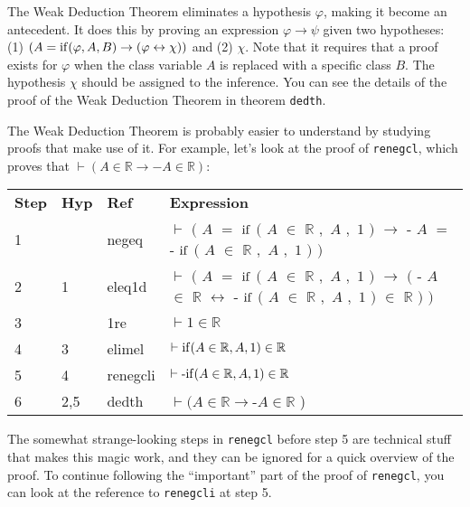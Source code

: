 The Weak Deduction Theorem
eliminates a hypothesis $\varphi$, making it become an antecedent.
It does this by proving an expression
$ \varphi \rightarrow \psi $ given two hypotheses:
(1)
$ ( A = {\rm if} ( \varphi , A , B ) \rightarrow ( \varphi \leftrightarrow \chi ) ) $
and
(2) $\chi$.
Note that it requires that a proof exists for $\varphi$ when the class variable
$A$ is replaced with a specific class $B$. The hypothesis $\chi$
should be assigned to the inference.
You can see the details of the proof of the Weak Deduction Theorem
in theorem \texttt{dedth}.

The Weak Deduction Theorem
is probably easier to understand by studying proofs that make use of it.
For example, let's look at the proof of \texttt{renegcl}, which proves that
$ \vdash ( A \in \mathbb{R} \rightarrow - A \in \mathbb{R} )$:

\begin{longtabu} {l l l X}
\textbf{Step} & \textbf{Hyp} & \textbf{Ref} & \textbf{Expression} \\
  1 &  & negeq &
  $\vdash$ $($ $A$ $=$ ${\rm if}$ $($ $A$ $\in$ $\mathbb{R}$ $,$ $A$ $,$ $1$ $)$ $\rightarrow$
  $\textrm{-}$ $A$ $=$ $\textrm{-}$ ${\rm if}$ $($ $A$ $\in$ $\mathbb{R}$
  $,$ $A$ $,$ $1$ $)$ $)$ \\
 2 & 1 & eleq1d &
    $\vdash$ $($ $A$ $=$ ${\rm if}$ $($ $A$ $\in$ $\mathbb{R}$ $,$ $A$ $,$ $1$ $)$ $\rightarrow$ $($
    $\textrm{-}$ $A$ $\in$ $\mathbb{R}$ $\leftrightarrow$
    $\textrm{-}$ ${\rm if}$ $($ $A$ $\in$ $\mathbb{R}$ $,$ $A$ $,$ $1$ $)$ $\in$
    $\mathbb{R}$ $)$ $)$ \\
 3 &  & 1re & $\vdash 1 \in \mathbb{R}$ \\
 4 & 3 & elimel &
   $\vdash {\rm if} ( A \in \mathbb{R} , A , 1 ) \in \mathbb{R}$ \\
 5 & 4 & renegcli &
   $\vdash \textrm{-} {\rm if} ( A \in \mathbb{R} , A , 1 ) \in \mathbb{R}$ \\
 6 & 2,5 & dedth &
   $\vdash ( A \in \mathbb{R} \rightarrow \textrm{-} A \in \mathbb{R}$ ) \\
\end{longtabu}

The somewhat strange-looking steps in \texttt{renegcl} before step 5 are
technical stuff that makes this magic work, and they can be ignored
for a quick overview of the proof. To continue following the ``important''
part of the proof of \texttt{renegcl},
you can look at the reference to \texttt{renegcli} at step 5.

